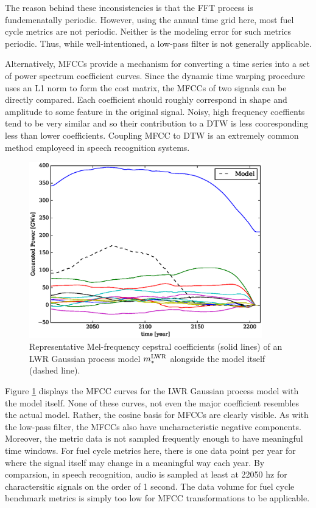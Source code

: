 The reason behind these inconsistencies is that the FFT process is fundemenatally 
periodic.  However, using the annual time grid here, most fuel cycle metrics 
are not periodic. Neither is the modeling error for such metrics periodic. 
Thus, while well-intentioned, a low-pass filter is not generally applicable.

Alternatively, MFCCs provide a mechanism for converting a time series into a 
set of power spectrum coefficient curves. Since the dynamic time warping procedure
uses an L1 norm to form the cost matrix, the MFCCs of two signals can be directly 
compared. Each coefficient should roughly correspond in shape and amplitude to some
feature in the original signal.  Noisy, high frequency coeffients tend to be 
very similar and so their contribution to a DTW is less cooresponding less than 
lower coefficients. Coupling MFCC to DTW is an extremely common method employeed in 
speech recognition systems.  

\begin{figure}[htb]
\centering
\includegraphics[width=0.9\textwidth]{mfcc-lwr-model.eps}
\caption{Representative Mel-frequency cepstral coefficients (solid lines) of an 
LWR Gaussian process model $m_*^{\mathrm{LWR}}$ alongside the model itself (dashed line).}
\label{mfcc-lwr-model}
\end{figure}

Figure \ref{mfcc-lwr-model} displays the MFCC curves for the LWR Gaussian 
process model with the model itself. None of these curves, not even the major 
coefficient resembles the actual model.  Rather, the cosine basis for MFCCs
are clearly visible.  As with the low-pass filter, the MFCCs also have 
uncharacteristic negative components.  Moreover, 
the metric data is not sampled frequently enough to have meaningful
time windows. For fuel cycle metrics here, there is one data point per year for 
where the signal itself may change in a meaningful way each year. By comparsion, 
in speech recognition, audio is sampled at least at 22050 hz for charactersitic 
signals on the order of 1 second.  The data volume for fuel cycle benchmark metrics
is simply too low for MFCC transformations to be applicable. 


